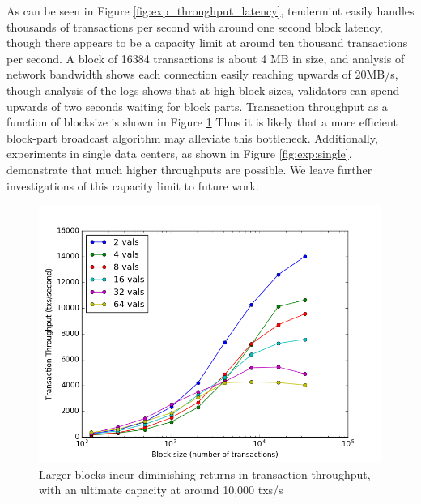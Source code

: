 As can be seen in Figure \ref{fig:exp_throughput_latency}, 
tendermint easily handles thousands of transactions per second with around one second block latency,
though there appears to be a capacity limit at around ten thousand transactions per second.
A block of 16384 transactions is about 4 MB in size, and analysis of network bandwidth shows each connection
easily reaching upwards of 20MB/s, though analysis of the logs shows that at high block sizes, 
validators can spend upwards of two seconds waiting for block parts.
Transaction throughput as a function of blocksize is shown in Figure \ref{fig:exp:throughput_blocksize}
Thus it is likely that a more efficient block-part broadcast algorithm may alleviate this bottleneck.
Additionally, experiments in single data centers, as shown in Figure \ref{fig:exp:single},
demonstrate that much higher throughputs are possible. We leave further investigations of this capacity limit to future work.


\begin{figure}[]
	\includegraphics[width=\linewidth,height=\textheight,keepaspectratio]{figures/throughput/throughput-blocksize.png}
    	\centering
	\caption[Throughput-blocksize in non-faulty network]{Larger blocks incur diminishing returns in transaction throughput, with an ultimate capacity at around 10,000 txs/s}
	\label{fig:exp:throughput_blocksize}
\end{figure}

